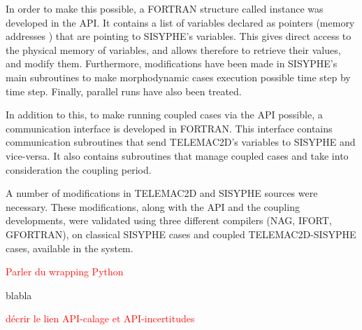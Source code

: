 In order to make this possible, a FORTRAN structure called instance was developed in the API. It contains a list of variables declared as pointers (memory addresses \cite{bib10}) that are pointing to SISYPHE's variables. This gives direct access to the physical memory of variables, and allows therefore to retrieve their values, and modify them. Furthermore, modifications have been made in SISYPHE's main subroutines to make morphodynamic cases execution possible time step by time step. Finally, parallel runs have also been treated.

In addition to this, to make running coupled cases via the API possible, a communication interface is developed in FORTRAN. This interface contains communication subroutines that send TELEMAC2D's variables to SISYPHE and vice-versa. It also contains subroutines that manage coupled cases and take into consideration the coupling period. 

A number of modifications in TELEMAC2D and SISYPHE sources were necessary. These modifications, along with the API and the coupling developments, were validated using three different compilers (NAG, IFORT, GFORTRAN), on classical SISYPHE cases and coupled TELEMAC2D-SISYPHE cases, available in the system.

\textcolor{red}{Parler du wrapping Python}

blabla

\textcolor{red}{décrir le lien API-calage et API-incertitudes}
